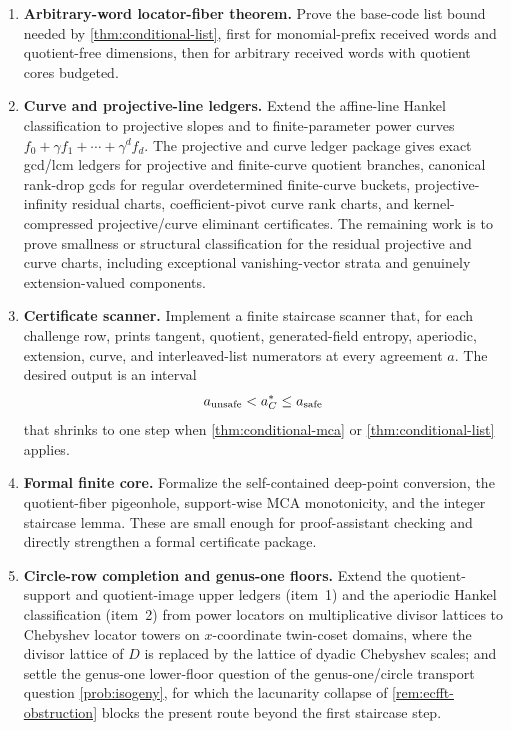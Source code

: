 \documentclass[11pt]{article}
\theoremstyle{definition}
\theoremstyle{remark}
\begin{document}
\begin{enumerate}[label=\textbf{T\arabic*.},leftmargin=2.5em]
\item \textbf{Arbitrary-word locator-fiber theorem.}  Prove the base-code list
bound needed by \cref{thm:conditional-list}, first for monomial-prefix received
words and quotient-free dimensions, then for arbitrary received words with
quotient cores budgeted.

\item \textbf{Curve and projective-line ledgers.}  Extend the affine-line Hankel
classification to projective slopes and to finite-parameter power curves
$f_0+\gamma f_1+\cdots+\gamma^d f_d$.  The projective and curve ledger package gives exact gcd/lcm ledgers
for projective and finite-curve quotient branches, canonical rank-drop gcds for
regular overdetermined finite-curve buckets, projective-infinity residual charts,
coefficient-pivot curve rank charts, and kernel-compressed projective/curve
eliminant certificates.  The remaining work is to prove smallness or structural
classification for the residual projective and curve charts, including
exceptional vanishing-vector strata and genuinely extension-valued components.

\item \textbf{Certificate scanner.}  Implement a finite staircase scanner that,
for each challenge row, prints tangent, quotient, generated-field entropy,
aperiodic, extension, curve, and interleaved-list numerators at every agreement
$a$.  The desired output is an interval
\[
        a_{\rm unsafe}<a_C^*\le a_{\rm safe}
\]
that shrinks to one step when \cref{thm:conditional-mca} or
\cref{thm:conditional-list} applies.

\item \textbf{Formal finite core.}  Formalize the self-contained deep-point
conversion, the quotient-fiber pigeonhole, support-wise MCA monotonicity, and
the integer staircase lemma.  These are small enough for proof-assistant
checking and directly strengthen a formal certificate package.

\item \textbf{Circle-row completion and genus-one floors.}  Extend the
quotient-support and quotient-image upper ledgers (item~1) and the aperiodic
Hankel classification (item~2) from power locators on multiplicative divisor
lattices to Chebyshev locator towers on $x$-coordinate twin-coset domains,
where the divisor lattice of $D$ is replaced by the lattice of dyadic
Chebyshev scales; and settle the genus-one lower-floor question of
the genus-one/circle transport question \cref{prob:isogeny}, for which the lacunarity collapse of
\cref{rem:ecfft-obstruction} blocks the present route beyond the first
staircase step.
\end{enumerate}
\end{document}
